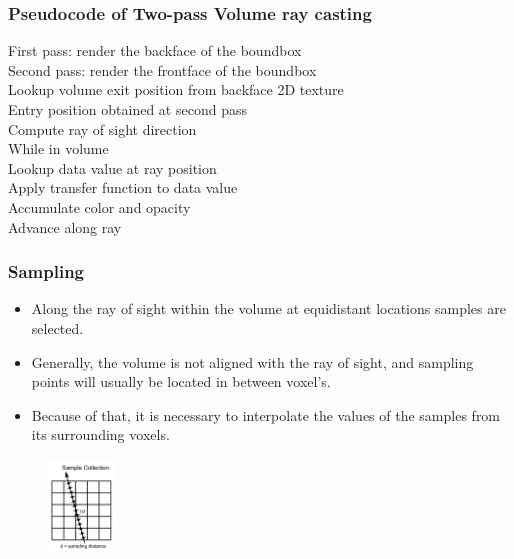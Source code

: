 \documentclass{beamer}
\begin{document}
\begin{frame}[fragile] %
\frametitle{Pseudocode of Two-pass Volume ray casting}
First pass: render the backface of the boundbox  \\
Second pass: render the frontface of the boundbox \\
Lookup volume exit position from backface 2D texture  \\
Entry position obtained at second pass    \\
Compute ray of sight direction  \\
While in volume  \\
\hspace{35pt} Lookup data value at ray position \\ 
\hspace{35pt} Apply transfer function to data value \\ 
\hspace{35pt} Accumulate color and opacity  \\
\hspace{35pt} Advance along ray\\
\end{frame}


\begin{frame}
\frametitle{Sampling}
\begin{itemize}
\item Along the ray of sight within the volume at equidistant locations samples are selected. 
\item Generally, the volume is not aligned with the ray of sight, and sampling points will usually be located in between voxel's.
\item Because of that, it is necessary to interpolate the values of the samples from its surrounding voxels.
\end{itemize}
\begin{figure}
\centering
\includegraphics[width=50pt]{sampling1.jpg}
\end{figure}
\end{frame}

\end{document}
